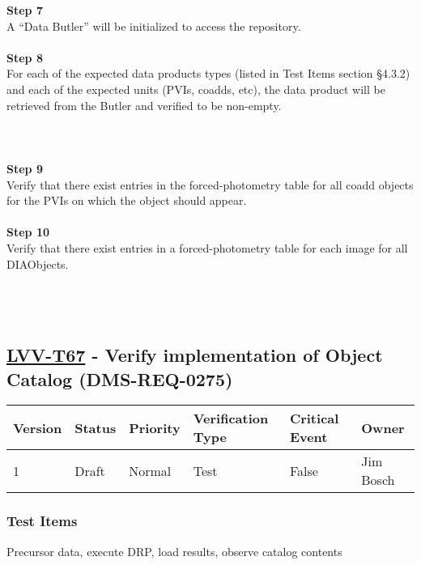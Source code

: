 \textbf{Step 7}\\
A ``Data Butler'' will be initialized to access the repository.\\
~\\
\textbf{Step 8}\\
For each of the expected data products types (listed in Test Items
section §4.3.2) and each of the expected units (PVIs, coadds, etc), the
data product will be retrieved from the Butler and verified to be
non-empty.\\
~\\
~\\
~\\
\textbf{Step 9}\\
Verify that there exist entries in the forced-photometry table for all
coadd objects for the PVIs on which the object should appear.\\
~\\
\textbf{Step 10}\\
Verify that there exist entries in a forced-photometry table for each
image for all DIAObjects.\\
~\\
~\\
~\\

\hypertarget{lvv-t67---verify-implementation-of-object-catalog-dms-req-0275}{%
\subsection{\texorpdfstring{\href{https://jira.lsstcorp.org/secure/Tests.jspa\#/testCase/LVV-T67}{LVV-T67}
- Verify implementation of Object Catalog
(DMS-REQ-0275)}{LVV-T67 - Verify implementation of Object Catalog (DMS-REQ-0275)}}\label{lvv-t67---verify-implementation-of-object-catalog-dms-req-0275}}

\begin{longtable}[]{@{}llllll@{}}
\toprule
Version & Status & Priority & Verification Type & Critical Event &
Owner\tabularnewline
\midrule
\endhead
1 & Draft & Normal & Test & False & Jim Bosch\tabularnewline
\bottomrule
\end{longtable}

\hypertarget{test-items-43}{%
\subsubsection{Test Items}\label{test-items-43}}

Precursor data, execute DRP, load results, observe catalog contents

